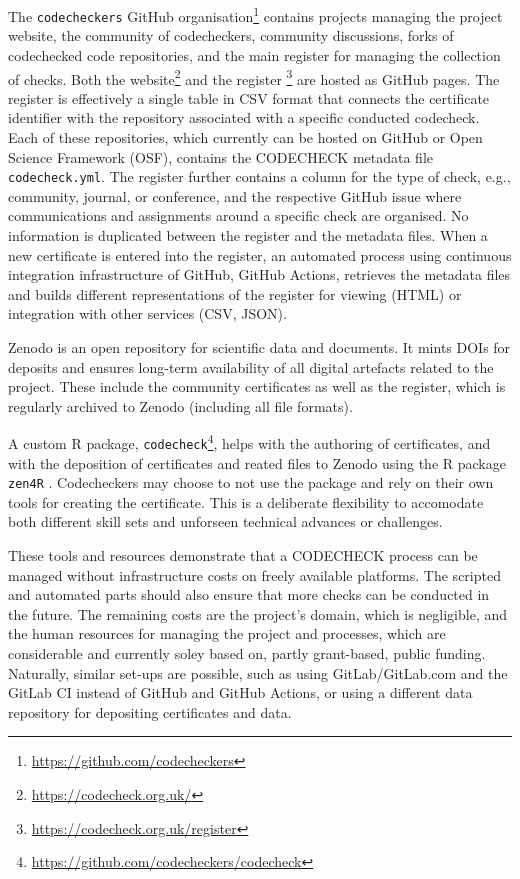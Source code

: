 \documentclass[12pt]{article}
\begin{document}
The \texttt{codecheckers} GitHub organisation\footnote{
\url{https://github.com/codecheckers}} contains projects managing the
project website, the community of codecheckers, community discussions,
forks of codechecked code repositories, and the main register for
managing the collection of checks. Both the website\footnote{
\url{https://codecheck.org.uk/}} and the register
\footnote{\url{https://codecheck.org.uk/register}} are hosted as GitHub
pages. The register is effectively a single table in CSV format that
connects the certificate identifier with the repository associated with
a specific conducted codecheck. Each of these repositories, which 
currently can be hosted on GitHub or Open Science Framework (OSF), 
contains the CODECHECK metadata file \texttt{codecheck.yml}. The register
further contains a column for the type of check, e.g., community, journal,
or conference, and the respective GitHub issue where communications and 
assignments around a specific check are organised. No information is 
duplicated between the register and the metadata files. When a new
certificate is entered into the register, an automated process using 
continuous integration infrastructure of GitHub, GitHub Actions, retrieves
the metadata files and builds different representations of the register
for viewing (HTML) or integration with other services (CSV, JSON).

Zenodo is an open repository for scientific data and documents. It
mints DOIs for deposits and ensures long-term availability of all digital
artefacts related to the project. These include the community 
certificates as well as the register, which is regularly archived to 
Zenodo \cite{codecheck_register} (including all file formats).

A custom R package, \texttt{codecheck}\footnote{
\url{https://github.com/codecheckers/codecheck}}, helps with the authoring
of certificates, and with the deposition of certificates and reated files to
Zenodo using the R package \texttt{zen4R} \cite{zen4r}.
Codecheckers may choose to not use the package and rely on their own tools
for creating the certificate. This is a deliberate flexibility to
accomodate both different skill sets and unforseen technical advances or
challenges.

These tools and resources demonstrate that a CODECHECK process can be
managed without infrastructure costs on freely available platforms.
The scripted and automated parts should also ensure that more checks can
be conducted in the future.
The remaining costs are the project's domain, which is negligible, and
the human resources for managing the project and processes, which are
considerable and currently soley based on, partly grant-based, public funding.
Naturally, similar set-ups are possible, such as using GitLab/GitLab.com 
and the GitLab CI instead of GitHub and GitHub Actions, or using a different 
data repository for depositing certificates and data.
\end{document}
